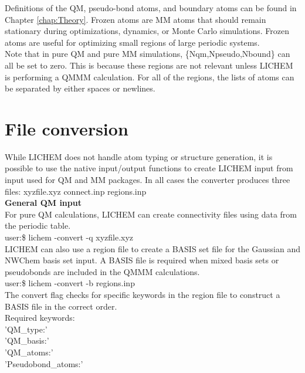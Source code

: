 \documentclass[12pt]{report}
\begin{document}
Definitions of the QM, pseudo-bond atoms, and boundary atoms can be found in
Chapter \ref{chap:Theory}.
Frozen atoms are MM atoms that should remain stationary during optimizations,
dynamics, or Monte Carlo simulations.
Frozen atoms are useful for optimizing small regions of large periodic
systems. \\

Note that in pure QM and pure MM simulations, \{Nqm,Npseudo,Nbound\} can all
be set to zero.
This is because these regions are not relevant unless LICHEM is performing a
QMMM calculation.
For all of the regions, the lists of atoms can be separated by either spaces
or newlines.

\section{File conversion}

While LICHEM does not handle atom typing or structure generation, it is
possible to use the native input/output functions to create LICHEM input from
input used for QM and MM packages.
In all cases the converter produces three files: xyzfile.xyz connect.inp
regions.inp \\

{\textbf{General QM input}} \\

For pure QM calculations, LICHEM can create connectivity files using data
from the periodic table. \\

user:\$ lichem -convert -q xyzfile.xyz \\

LICHEM can also use a region file to create a BASIS set file for the Gaussian
and NWChem basis set input.
A BASIS file is required when mixed basis sets or pseudobonds are included
in the QMMM calculations. \\

user:\$ lichem -convert -b regions.inp \\

The convert flag checks for specific keywords in the region file to construct
a BASIS file in the correct order. \\

Required keywords: \\
'QM\_type:' \\
'QM\_basis:' \\
'QM\_atoms:' \\
'Pseudobond\_atoms:' \\
\end{document}
